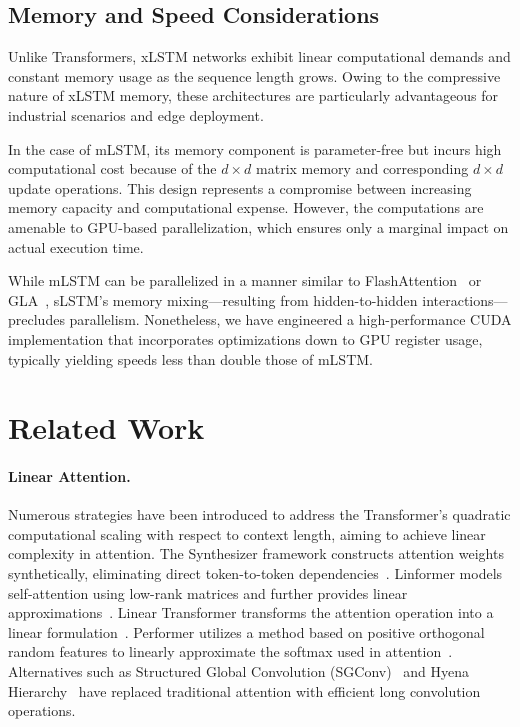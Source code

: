 \subsection{Memory and Speed Considerations}

Unlike Transformers, xLSTM networks exhibit linear computational demands and constant memory usage as the sequence length grows. Owing to the compressive nature of xLSTM memory, these architectures are particularly advantageous for industrial scenarios and edge deployment.

In the case of mLSTM, its memory component is parameter-free but incurs high computational cost because of the $d \times d$ matrix memory and corresponding $d \times d$ update operations. This design represents a compromise between increasing memory capacity and computational expense. However, the computations are amenable to GPU-based parallelization, which ensures only a marginal impact on actual execution time.

While mLSTM can be parallelized in a manner similar to FlashAttention~\citep{Dao:22,Dao:23} or GLA~\citep{Yang:23arxiv}, sLSTM's memory mixing—resulting from hidden-to-hidden interactions—precludes parallelism. Nonetheless, we have engineered a high-performance CUDA implementation that incorporates optimizations down to GPU register usage, typically yielding speeds less than double those of mLSTM.

\section{Related Work}
\label{sec:related}

\paragraph{Linear Attention.} Numerous strategies have been introduced to address the Transformer’s quadratic computational scaling with respect to context length, aiming to achieve linear complexity in attention. The Synthesizer framework constructs attention weights synthetically, eliminating direct token-to-token dependencies~\citep{Tay:20arxiv}. Linformer models self-attention using low-rank matrices and further provides linear approximations~\citep{Wang:20arxiv}. Linear Transformer transforms the attention operation into a linear formulation~\citep{Katharopoulos:20}. Performer utilizes a method based on positive orthogonal random features to linearly approximate the softmax used in attention~\citep{Choromanski:21}. Alternatives such as Structured Global Convolution (SGConv)~\citep{Li:22} and Hyena Hierarchy~\citep{Poli:23} have replaced traditional attention with efficient long convolution operations.

